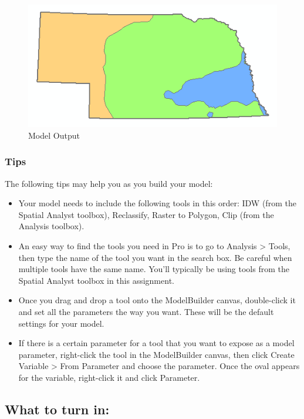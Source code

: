 \documentclass[]{article}
\begin{document}
\begin{figure}
\centering
\includegraphics{./labs/images/project1_model_output.png}
\caption{Model Output}
\end{figure}

\hypertarget{tips}{%
\subsubsection{Tips}\label{tips}}

The following tips may help you as you build your model:

\begin{itemize}
\item
  Your model needs to include the following tools in this order: IDW
  (from the Spatial Analyst toolbox), Reclassify, Raster to Polygon,
  Clip (from the Analysis toolbox).
\item
  An easy way to find the tools you need in Pro is to go to Analysis
  \textgreater{} Tools, then type the name of the tool you want in the
  search box. Be careful when multiple tools have the same name. You'll
  typically be using tools from the Spatial Analyst toolbox in this
  assignment.
\item
  Once you drag and drop a tool onto the ModelBuilder canvas,
  double-click it and set all the parameters the way you want. These
  will be the default settings for your model.
\item
  If there is a certain parameter for a tool that you want to expose as
  a model parameter, right-click the tool in the ModelBuilder canvas,
  then click Create Variable \textgreater{} From Parameter and choose
  the parameter. Once the oval appears for the variable, right-click it
  and click Parameter.
\end{itemize}

\newpage

\hypertarget{what-to-turn-in}{%
\subsection{What to turn in:}\label{what-to-turn-in}}
\end{document}
